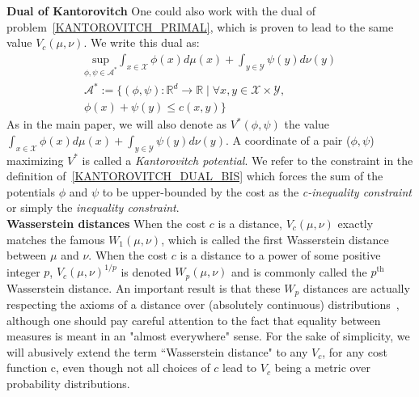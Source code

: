 \documentclass[runningheads]{llncs}
\begin{document}
\textbf{Dual of Kantorovitch} One could also work with the dual of problem~\eqref{KANTOROVITCH_PRIMAL}, which is proven to lead to the same value $V_c(\mu,\nu)$. We write this dual as:
\begin{equation}
\begin{gathered}
\underset{\phi,\psi \in \mathcal{A}^* }{\text{sup}}
 \int_{ x \in \mathcal{X}} \phi(x) d\mu(x) + \int_{ y \in \mathcal{Y}} \psi(y) d\nu(y) \\
\mathcal{A}^*:= 
\{(\phi,\psi): \mathds{R}^d\rightarrow \mathds{R} \mid
\forall x,y  \in \mathcal{X}\times \mathcal{Y}, \\
 \phi(x)+\psi(y) \leqslant c(x,y)\}
\end{gathered}
\label{KANTOROVITCH_DUAL_BIS}
\end{equation}
As in the main paper, we will also denote as $V^*(\phi,\psi)$ the value $\int_{ x \in \mathcal{X}} \phi(x) d\mu(x) + \int_{ y \in \mathcal{Y}} \psi(y) d\nu(y)$. A coordinate of a pair ($\phi,\psi$) maximizing $V^*$ is called a \textit{Kantorovitch potential}. We refer to the constraint in the definition of~\eqref{KANTOROVITCH_DUAL_BIS} which forces the sum of the potentials $\phi$ and $\psi$ to be upper-bounded by the cost as the \emph{c-inequality constraint} or simply the \emph{inequality constraint}.\\

\textbf{Wasserstein distances} When the cost $c$ is a distance, $V_c(\mu, \nu)$ exactly matches the famous $W_1(\mu,\nu)$, which is called the first Wasserstein distance between $\mu$ and $\nu$. When the cost $c$ is a distance to a power of some positive integer $p$, $V_c(\mu, \nu)^{1/p}$ is denoted $W_p(\mu, \nu)$ and is commonly called the $p^{\mathrm{th}}$ Wasserstein distance. An important result is that these $W_p$ distances are actually respecting the axioms of a distance over (absolutely continuous) distributions~\citep{Villani}, although one should pay careful attention to the fact that equality between measures is meant in an "almost everywhere" sense. For the sake of simplicity, we will abusively extend the term ``Wasserstein distance" to any $V_c$, for any cost function c, even though not all choices of $c$ lead to $V_c$ being a metric over probability distributions. \\
\end{document}
